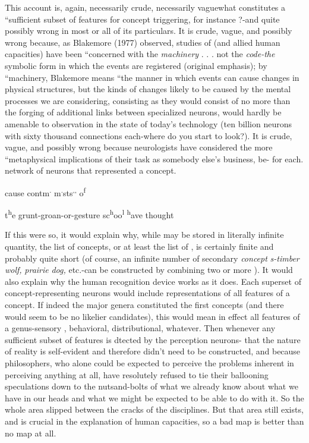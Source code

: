 This account is, again, necessarily crude, necessarily vague\-what constitutes a ``sufficient subset of features for concept trig\-gering, for instance ?-and quite possibly wrong in most or all of its particulars. It is crude, vague, and possibly wrong because, as Blake\-more (1977) observed, studies of  (and allied human capacities) have been ``concerned with the \textit{machinery} . . . not the \textit{code-the }sym\-bolic form in which the events are registered (original emphasis); by ``machinery, Blakemore means ``the manner in which events can cause changes in physical structures, but the kinds of changes likely to be caused by the mental processes we are considering, consisting as they would consist of no more than the forging of additional links between specialized neurons, would hardly be amenable to observation in the state of today's technology (ten billion neurons with sixty thousand connections each-where do you start to look?). It is crude, vague, and possibly wrong because neurologists have considered the more ``meta\-physical implications of their task as somebody else's business, be-
for each. network of neurons that represented a concept.

cause
\textsuperscript{{\textquotedbl}}contm\textsuperscript{.} m\textsuperscript{.}sts\textsuperscript{,,} o\textsuperscript{f}

t\textsuperscript{h}e grunt-groan-or-gesture sc\textsuperscript{h}oo\textsuperscript{l} \textsuperscript{h}ave thought

If this were so, it would explain why, while  may be stored in literally infinite quantity, the list of concepts, or at least the list of , is certainly finite and probably quite short (of course, an infinite number of secondary \textit{concept} \textit{s-timber} \textit{wolf,} \textit{prairie} \textit{dog,} etc.-can be constructed by combining two or more ). It would also explain why the human recognition device works as it does. Each superset of concept-representing neurons would include representations of all features of a concept. If indeed the major genera constituted the first concepts (and there would seem to be no likelier candidates), this would mean in effect all features of a genus-sensory , behavioral, distributional, whatever. Then whenever any sufficient subset of features is dtected by the perception neurons-
that the nature of reality is self-evident and therefore didn't need to be constructed, and because philosophers, who alone could be expected to perceive the problems inherent in perceiving anything at all, have resolutely refused to tie their ballooning speculations down to the nuts\-and-bolts of what we already know about what we have in our heads and what we might be expected to be able to do with it. So the whole area slipped between the cracks of the disciplines. But that area still exists, and is crucial in the explanation of human capacities, so a bad map is better than no map at all.

